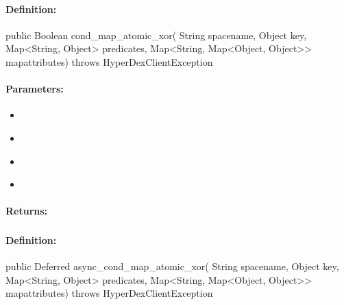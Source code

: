 \paragraph{Definition:}
\begin{javacode}
public Boolean cond_map_atomic_xor(
        String spacename,
        Object key,
        Map<String, Object> predicates,
        Map<String, Map<Object, Object>> mapattributes) throws HyperDexClientException
\end{javacode}

\paragraph{Parameters:}
\begin{itemize}[noitemsep]
\item {}\\

\item {}\\

\item {}\\

\item {}\\

\end{itemize}

\paragraph{Returns:}


\pagebreak
\subsubsection{}
\label{api:java:async_cond_map_atomic_xor}


\paragraph{Definition:}
\begin{javacode}
public Deferred async_cond_map_atomic_xor(
        String spacename,
        Object key,
        Map<String, Object> predicates,
        Map<String, Map<Object, Object>> mapattributes) throws HyperDexClientException
\end{javacode}

